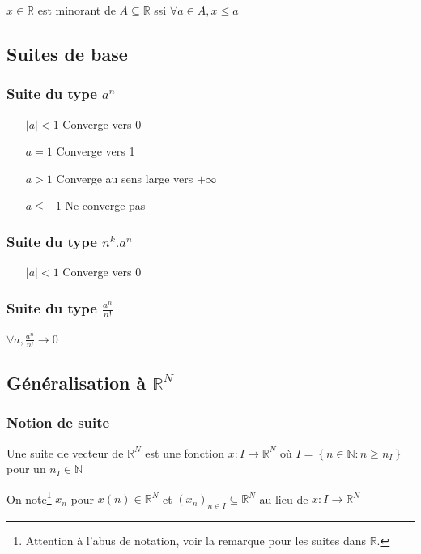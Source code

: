 \documentclass[a4paper,10pt]{article}
\newcommand{\ap}{\rightarrow}
\newcommand{\R}{\mathbb{R}}
\newcommand{\N}{\mathbb{N}}
\newcommand{\tset}[1]{\left\lbrace #1 \right\rbrace}
\newcommand{\abs}[1]{\left\vert #1 \right\vert}
\begin{document}
$x\in \R$ est minorant de $A \subseteq \R$ ssi $\forall a \in A, x \leq a$

\subsection{Suites de base}


\subsubsection{Suite du type $a^n$}
\begin{itemize}
	\item[$\abs{a} < 1$]{Converge vers 0}
	\item[$a=1$]{Converge vers 1}
	\item[$a>1$]{Converge au sens large vers $+\infty$}
	\item[$a \leq -1$]{Ne converge pas}
\end{itemize}

\subsubsection{Suite du type $n^k.a^n$}

\begin{itemize}
	\item[$\abs{a} < 1$]{Converge vers 0}
\end{itemize}


\subsubsection{Suite du type $\frac{a^n}{n!}$}

$\forall a, \frac{a^n}{n!} \ap 0$

\subsection{Généralisation à $\R^{N}$}

\subsubsection{Notion de suite}

Une suite de vecteur de $\R^N$ est une fonction $x : I \ap \R^N$ où $I = \tset{n \in \N : n \geq n_I}$ pour un $n_I \in \N$

On note\footnote{Attention à l'abus de notation, voir la remarque pour les suites dans $\R$.} $x_n$ pour $x(n) \in \R^N$ et $(x_n)_{n\in I} \subseteq \R^N$ au lieu de $x : I \ap \R^N$
\end{document}
